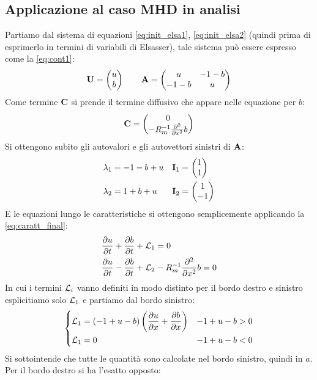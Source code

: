 \subsection{Applicazione al caso MHD in analisi}
Partiamo dal sistema di equazioni \ref{eq:init_elsa1}, \ref{eq:init_elsa2} (quindi prima di esprimerlo in termini di variabili di Elsasser), tale sistema può essere espresso come la \ref{eq:cont1}:
\[
    \vv{U} = \begin{pmatrix} u \\ b \end{pmatrix} 
    \qquad \vv{A} = \begin{pmatrix} u & -1 - b \\ -1-b & u\end{pmatrix} 
\]
Come termine $\vv{C}$ si prende il termine diffusivo che appare nelle equazione per $b$:
\[
    \vv{C} = \begin{pmatrix} 0 \\ -R_m^{-1} \frac{\partial^2}{\partial x^2} b  \end{pmatrix}
\]
Si ottengono subito gli autovalori e gli autovettori sinistri di $\vv{A}$:
\begin{align*}
    &\lambda_1 = -1-b+u     && \vv{I}_1 = \begin{pmatrix} 1 \\ 1 \end{pmatrix}\\
    &\lambda_2 = 1+b+u     && \vv{I}_2 = \begin{pmatrix} 1 \\ -1 \end{pmatrix}
\end{align*}
E le equazioni lungo le caratteristiche si ottengono semplicemente applicando la \ref{eq:caratt_final}:
\begin{align*}
    & \frac{\partial u}{\partial t} + \frac{\partial b}{\partial t} + \mathcal{L}_1 = 0\\
    & \frac{\partial u}{\partial t} - \frac{\partial b}{\partial t} + \mathcal{L}_2 - R_m^{-1} \frac{\partial^2}{\partial x^2} b = 0\\
\end{align*}
In cui i termini $\mathcal{L}_i$ vanno definiti in modo distinto per il bordo destro e sinistro esplicitiamo solo $\mathcal{L}_1$ e partiamo dal bordo sinistro: 
\[
    \begin{dcases}
	\mathcal{L}_1 = (-1+u-b)\left(\frac{\partial u}{\partial x} + \frac{\partial b}{\partial x}\right) & -1 + u - b > 0\\
	\mathcal{L}_1 = 0 & -1 + u - b < 0\\
    \end{dcases}
\]
Si sottointende che tutte le quantità sono calcolate nel bordo sinistro, quindi in $a$. Per il bordo destro si ha l'esatto opposto:
